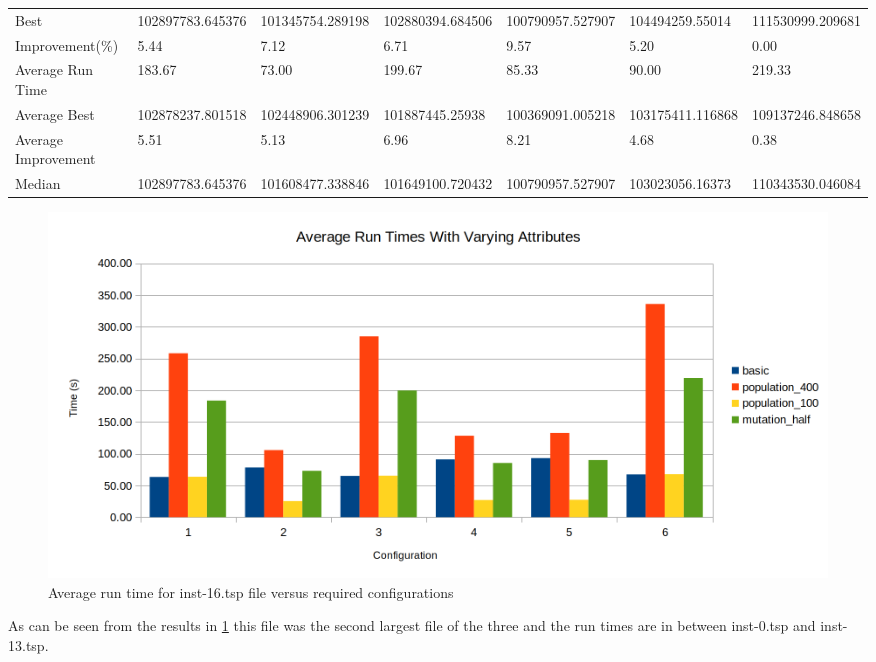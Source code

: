 \begin{table}[H]
{\begin{tabular}{lllllll}
\cellcolor[HTML]{ECF4FF}Best                & 102897783.645376 & 101345754.289198 & 102880394.684506 & 100790957.527907 & 104494259.55014  & 111530999.209681 \\
\cellcolor[HTML]{ECF4FF}Improvement(\%)     & 5.44             & 7.12             & 6.71             & 9.57             & 5.20             & 0.00             \\
\rowcolor[HTML]{CBCEFB} 
\cellcolor[HTML]{DAE8FC}Average Run Time    & 183.67           & 73.00            & 199.67           & 85.33            & 90.00            & 219.33           \\
\rowcolor[HTML]{CBCEFB} 
\cellcolor[HTML]{DAE8FC}Average Best        & 102878237.801518 & 102448906.301239 & 101887445.25938  & 100369091.005218 & 103175411.116868 & 109137246.848658 \\
\rowcolor[HTML]{CBCEFB} 
\cellcolor[HTML]{DAE8FC}Average Improvement & 5.51             & 5.13             & 6.96             & 8.21             & 4.68             & 0.38             \\
\rowcolor[HTML]{CBCEFB} 
\cellcolor[HTML]{DAE8FC}Median              & 102897783.645376 & 101608477.338846 & 101649100.720432 & 100790957.527907 & 103023056.16373  & 110343530.046084
\end{tabular}%
}
\end{table}

\begin{figure}[H]
\vspace{-5pt}
\centering
\includegraphics[width=1.0\textwidth]{images/inst-16run-time.png}
\caption{\label{fig:inst-16-run-time}Average run time for inst-16.tsp file versus required configurations}
\end{figure}

As can be seen from the results in \ref{fig:inst-16-run-time} this file was the second largest file of the three and the run times are in between inst-0.tsp and inst-13.tsp.


